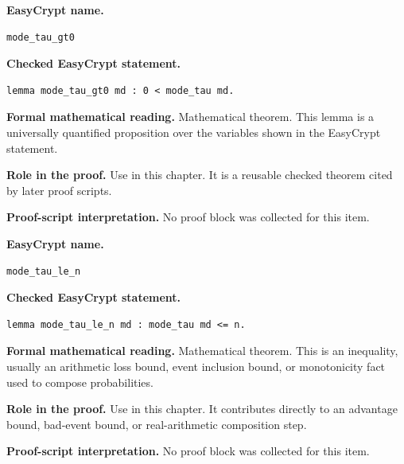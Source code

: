 \begin{formaltheorem}
\noindent\textbf{EasyCrypt name.}
\begin{lstlisting}[language=EasyCrypt,basicstyle=\ttfamily\scriptsize]
mode_tau_gt0
\end{lstlisting}
\noindent\textbf{Checked EasyCrypt statement.}
\begin{lstlisting}[language=EasyCrypt,basicstyle=\ttfamily\scriptsize]
lemma mode_tau_gt0 md : 0 < mode_tau md.
\end{lstlisting}
\noindent\textbf{Formal mathematical reading.}
Mathematical theorem. This lemma is a universally quantified proposition over the variables shown in the EasyCrypt statement.

\noindent\textbf{Role in the proof.}
Use in this chapter. It is a reusable checked theorem cited by later proof scripts.

\noindent\textbf{Proof-script interpretation.}
No proof block was collected for this item.

\end{formaltheorem}

\begin{formaltheorem}
\noindent\textbf{EasyCrypt name.}
\begin{lstlisting}[language=EasyCrypt,basicstyle=\ttfamily\scriptsize]
mode_tau_le_n
\end{lstlisting}
\noindent\textbf{Checked EasyCrypt statement.}
\begin{lstlisting}[language=EasyCrypt,basicstyle=\ttfamily\scriptsize]
lemma mode_tau_le_n md : mode_tau md <= n.
\end{lstlisting}
\noindent\textbf{Formal mathematical reading.}
Mathematical theorem. This is an inequality, usually an arithmetic loss bound, event inclusion bound, or monotonicity fact used to compose probabilities.

\noindent\textbf{Role in the proof.}
Use in this chapter. It contributes directly to an advantage bound, bad-event bound, or real-arithmetic composition step.

\noindent\textbf{Proof-script interpretation.}
No proof block was collected for this item.

\end{formaltheorem}

